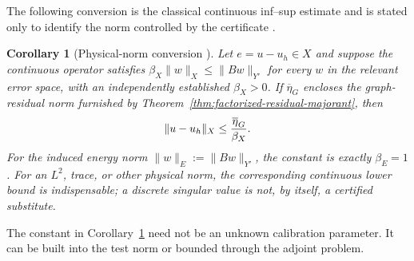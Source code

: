 \documentclass[11pt]{article}
\newtheorem{corollary}[theorem]{Corollary}
\numberwithin{algorithm}{section}
\theoremstyle{definition}\newtheorem{definition}[theorem]{Definition}
\theoremstyle{remark}\newtheorem{remark}[theorem]{Remark}
\begin{document}
The following conversion is the classical continuous inf--sup estimate and is
stated only to identify the norm controlled by the certificate
\cite{demkowiczgopalakrishnan2011}.
\begin{corollary}[Physical-norm conversion
  {\cite{demkowiczgopalakrishnan2011}}]
\label{cor:physical-norm-conversion}
Let $e=u-u_h\in X$ and suppose the continuous operator satisfies
$\beta_X\|w\|_X\leq\|Bw\|_{Y'}$ for every $w$ in the relevant error
space, with an independently established $\beta_X>0$.  If
$\overline\eta_G$ encloses the graph-residual norm furnished by
Theorem~\ref{thm:factorized-residual-majorant}, then
\begin{equation}
 \|u-u_h\|_X\leq {\overline\eta_G\over\beta_X}.
 \label{eq:physical-norm-conversion}
\end{equation}
For the induced energy norm $\|w\|_E:=\|Bw\|_{Y'}$, the constant is exactly
$\beta_E=1$.  For an $L^2$, trace, or other physical norm, the corresponding
continuous lower bound is indispensable; a discrete singular value is not,
by itself, a certified substitute.
\end{corollary}

The constant in Corollary~\ref{cor:physical-norm-conversion} need not be an
unknown calibration parameter.  It can be built into the test norm or bounded
through the adjoint problem.
\end{document}
